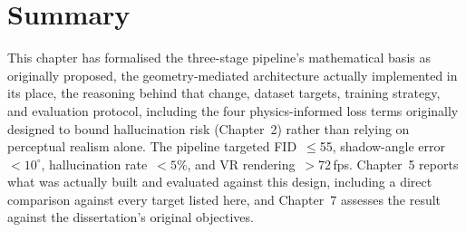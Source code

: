 \section{Summary}

This chapter has formalised the three-stage pipeline's mathematical basis as originally proposed, the geometry-mediated architecture actually implemented in its place, the reasoning behind that change, dataset targets, training strategy, and evaluation protocol, including the four physics-informed loss terms originally designed to bound hallucination risk (Chapter~2) rather than relying on perceptual realism alone. The pipeline targeted FID~$\leq$55, shadow-angle error~$<10^{\circ}$, hallucination rate~$<5\%$, and VR rendering~$>$72\,fps. Chapter~5 reports what was actually built and evaluated against this design, including a direct comparison against every target listed here, and Chapter~7 assesses the result against the dissertation's original objectives.
